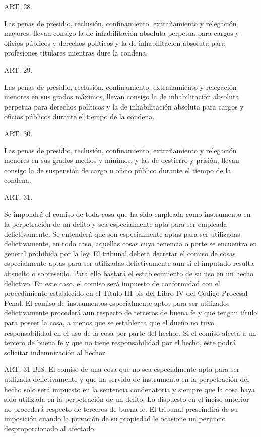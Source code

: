     ART. 28.

    Las penas de presidio, reclusión, confinamiento, extrañamiento y relegación mayores, llevan consigo la de inhabilitación absoluta perpetua para cargos y oficios públicos y derechos políticos y la de inhabilitación absoluta para profesiones titulares mientras dure la condena.


    ART. 29.

    Las penas de presidio, reclusión, confinamiento, extrañamiento y relegación menores en sus grados máximos, llevan consigo la de inhabilitación absoluta perpetua para derechos políticos y la de inhabilitación absoluta para cargos y oficios públicos durante el tiempo de la condena.


    ART. 30.

    Las penas de presidio, reclusión, confinamiento, extrañamiento y relegación menores en sus grados medios y mínimos, y las de destierro y prisión, llevan consigo la de suspensión de cargo u oficio público durante el tiempo de la condena.



    ART. 31.

    Se impondrá el comiso de toda cosa que ha sido empleada como instrumento en la perpetración de un delito y sea especialmente apta para ser empleada delictivamente. Se entenderá que son especialmente aptas para ser utilizadas delictivamente, en todo caso, aquellas cosas cuya tenencia o porte se encuentra en general prohibida por la ley.
    El tribunal deberá decretar el comiso de cosas especialmente aptas para ser utilizadas delictivamente aun si el imputado resulta absuelto o sobreseído. Para ello bastará el establecimiento de su uso en un hecho delictivo. En este caso, el comiso será impuesto de conformidad con el procedimiento establecido en el Título III bis del Libro IV del Código Procesal Penal.
    El comiso de instrumentos especialmente aptos para ser utilizados delictivamente procederá aun respecto de terceros de buena fe y que tengan título para poseer la cosa, a menos que se establezca que el dueño no tuvo responsabilidad en el uso de la cosa por parte del hechor.
    Si el comiso afecta a un tercero de buena fe y que no tiene responsabilidad por el hecho, éste podrá solicitar indemnización al hechor.



    ART. 31 BIS.
    El comiso de una cosa que no sea especialmente apta para ser utilizada delictivamente y que ha servido de instrumento en la perpetración del hecho sólo será impuesto en la sentencia condenatoria y siempre que la cosa haya sido utilizada en la perpetración de un delito.
    Lo dispuesto en el inciso anterior no procederá respecto de terceros de buena fe. El tribunal prescindirá de su imposición cuando la privación de su propiedad le ocasione un perjuicio desproporcionado al afectado.



